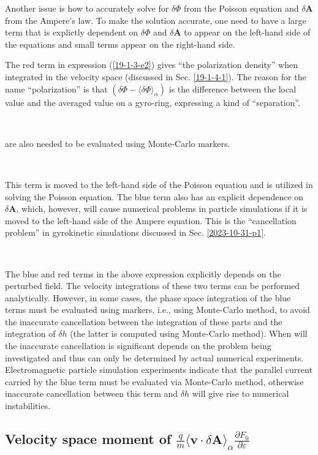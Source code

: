 \documentclass{article}
\begin{document}
Another issue is how to accurately solve for $\delta \Phi$ from the Poisson
equation and $\delta \mathbf{A}$ from the Ampere's law. To make the solution
accurate, one need to have a large term that is explictly dependent on $\delta
\Phi$ and $\delta \mathbf{A}$ to appear on the left-hand side of the equations
and small terms appear on the right-hand side.

The red term in expression (\ref{19-1-3-e2}) gives ``the polarization
density'' when integrated in the velocity space (discussed in Sec.
\ref{19-1-4-1}). The reason for the name ``polarization'' is that $(\delta
\Phi - \langle \delta \Phi \rangle_{\alpha})$ is the difference between the
local value and the averaged value on a gyro-ring, expressing a kind of
``separation''.

\

are also needed to be evaluated using Monte-Carlo markers.

\

This term is moved to the left-hand side of the Poisson equation and is
utilized in solving the Poisson equation. The blue term also has an explicit
dependence on $\delta \mathbf{A}$, which, however, will cause numerical
problems in particle simulations if it is moved to the left-hand side of the
Ampere equation. This is the ``cancellation problem'' in gyrokinetic
simulations discussed in Sec. \ref{2023-10-31-p1}.

\

The blue and red terms in the above expression explicitly depends on the
perturbed field. The velocity integrations of these two terms can be performed
analytically. However, in some cases, the phase space integration of the blue
terms must be evaluated using markers, i.e., using Monte-Carlo method, to
avoid the inaccurate cancellation between the integration of these parts and
the integration of $\delta h$ (the latter is computed using Monte-Carlo
method). When will the inaccurate cancellation is significant depends on the
problem being investigated and thus can only be determined by actual numerical
experiments. Electromagnetic particle simulation experiments indicate that the
parallel current carried by the blue term must be evaluated via Monte-Carlo
method, otherwise inaccurate cancellation between this term and $\delta h$
will give rise to numerical instabilities.

\subsection{Velocity space moment of $\frac{q}{m} \langle \mathbf{v} \cdot
\delta \mathbf{A} \rangle_{\alpha} \frac{\partial F_0}{\partial
\varepsilon}$}\label{19-3-21-8}
\end{document}
